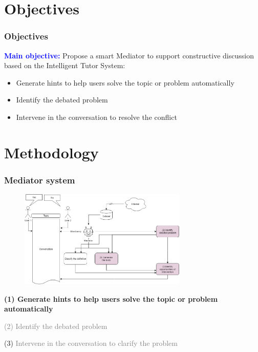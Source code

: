 \documentclass{beamer}
\begin{document}
\section{Objectives} %
\begin{frame}
\frametitle{Objectives}
{\large \textcolor{blue}{\textbf{Main objective:}}} Propose a smart Mediator to support constructive discussion based on the Intelligent Tutor System:

\begin{itemize}
	\item Generate hints to help users solve the topic or problem automatically
	\item    Identify the debated problem
	\item Intervene in the conversation to resolve the conflict
\end{itemize}

\end{frame}



\section{Methodology} %
\begin{frame}
\frametitle{Mediator system}
\begin{figure}
	\includegraphics[width=80mm]{2.png}
\end{figure}

\end{frame}
\begin{frame}
\par 	\textbf{(1)  Generate hints to help users solve the topic or problem automatically}
\par \textcolor{gray}{(2) Identify the debated problem }
\par (3) \textcolor{gray}{ Intervene in the conversation to clarify the problem }
\end{frame}
\end{document}

